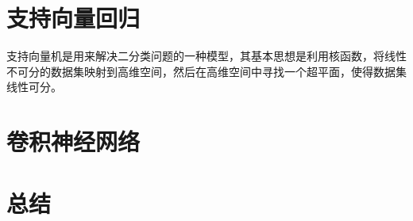 \documentclass[a4paper]{article}
\begin{document}
	\section{支持向量回归}
		支持向量机是用来解决二分类问题的一种模型，其基本思想是利用核函数，将线性不可分的数据集映射到高维空间，然后在高维空间中寻找一个超平面，使得数据集线性可分。
		
		
	\section{卷积神经网络}
	\section{总结}
\end{document}
